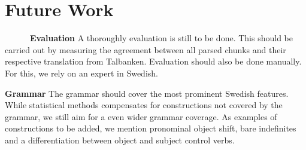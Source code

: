 \documentclass[runningheads,a4paper]{llncs}
\begin{document}
%



\section{Future Work}

~~~~~~\textbf{Evaluation}
A thoroughly evaluation is still to be done. This should be carried out by
measuring the agreement between all parsed chunks and their respective
translation from Talbanken. Evaluation should also be done manually.
For this, we rely on an expert in Swedish.

 
\textbf{Grammar}
The grammar should cover the most prominent Swedish features.
While statistical methods compensates for constructions not covered by
the grammar, we still aim for a even wider grammar coverage. 
As examples of constructions to be added, we mention
pronominal object shift, bare indefinites and a differentiation between
object and subject control verbs.
%
%
\end{document}
